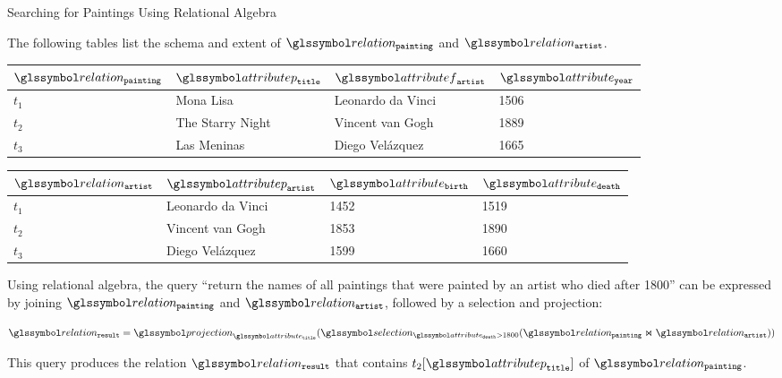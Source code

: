 \begin{example}[label=example:rel_alg_query]{Searching for Paintings Using Relational Algebra}{}

    The following tables list the schema and extent of $\relation_{\mathtt{painting}}$ and $\relation_{\mathtt{artist}}$.

    \begin{center}
        \begin{tabular}{ l || l | l | l |}
            $\relation_{\mathtt{painting}}$ & $\attributep_{\mathtt{title}}$  & $\attributef_{\mathtt{artist}}$  & $\attribute_{\mathtt{year}}$ \\ 
            \hline
            \hline
            $t_1$ & Mona Lisa &  Leonardo da Vinci & 1506 \\
            \hline
            $t_2$ & The Starry Night & Vincent van Gogh & 1889 \\
            \hline
            $t_3$ & Las Meninas & Diego Velázquez & 1665 \\
            \hline
        \end{tabular}
    \end{center}

    \begin{center}
        \begin{tabular}{ l || l | l | l |}
            $\relation_{\mathtt{artist}}$ & $\attributep_{\mathtt{artist}}$ & $\attribute_{\mathtt{birth}}$ & $\attribute_{\mathtt{death}}$\\ 
            \hline
            \hline
            $t_1$ & Leonardo da Vinci & 1452 & 1519 \\
            \hline
            $t_2$ & Vincent van Gogh & 1853 & 1890 \\
            \hline
            $t_3$ & Diego Velázquez & 1599 & 1660 \\
            \hline
        \end{tabular}
    \end{center}

    Using relational algebra, the query ``return the names of all paintings that were painted by an artist who died after 1800'' can be expressed by joining $\relation_{\mathtt{painting}}$ and $\relation_{\mathtt{artist}}$, followed by a selection and projection:

    \begin{equation*}
        \relation_{\mathtt{result}} = \projection_{\attribute_{\mathtt{title}}} (\selection_{\attribute_{\mathtt{death}} > 1800}(\relation_{\mathtt{painting}} \Join \relation_{\mathtt{artist}}))
    \end{equation*}

 This query produces the relation $\relation_{\mathtt{result}}$ that contains $t_2 [ \attributep_{\mathtt{title}} ]$ of $\relation_{\mathtt{painting}}$.
\end{example}

